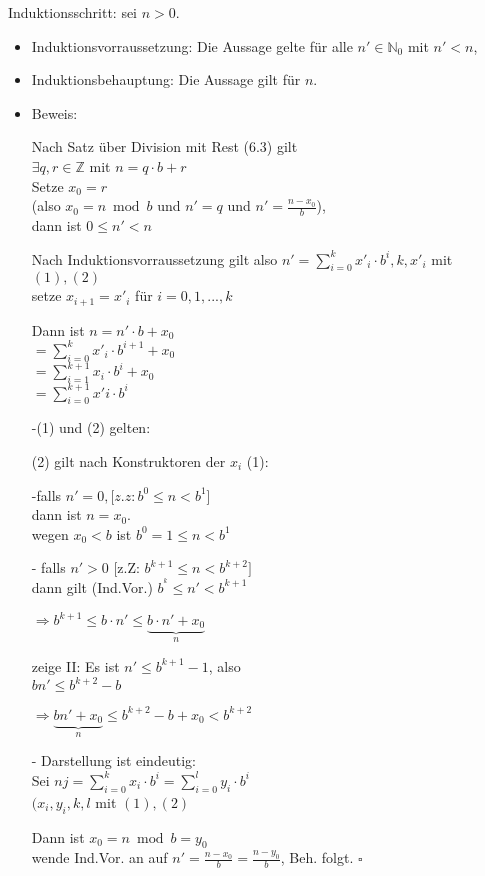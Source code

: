 \documentclass[a4paper, 12pt, twoside] {article}
\begin{document}
Induktionsschritt: sei $n > 0$.
\begin{itemize}

\item Induktionsvorraussetzung: Die Aussage gelte für alle $n' \in \mathbb{N}_0$ mit $n' < n$,

\item Induktionsbehauptung: Die Aussage gilt für $n$.


\item Beweis:

Nach Satz über Division mit Rest (6.3) gilt \\
$\exists q, r \in \mathbb{Z}$ mit $n = q \cdot b + r$ \\
Setze $x_0 = r$ \\
(also $x_0 = n \bmod b$ und $n' = q$ und $n' = \frac{n-x_0}{b}$), \\
dann ist $0 \leq n' < n$

Nach Induktionsvorraussetzung gilt also $n' = \displaystyle\sum_{i=0}^k x'_i  \cdot  b^i, k, x'_i$ mit $(1), (2)$ \\
setze $x_{i+1} = x'_i$ für $i = 0, 1, ..., k$

Dann ist $n = n' \cdot b + x_0$ \\
$=\displaystyle\sum_{i=0}^{k} x'_i \cdot b^{i+1} + x_0$ \\
$=\displaystyle\sum_{i=1}^{k+1} x_i  \cdot  b^i + x_0$ \\
$=\displaystyle\sum_{i=0}^{k+1} x'i  \cdot  b^i$

-(1) und (2) gelten:

(2) gilt nach Konstruktoren der $x_i$ \/
(1):

-falls $n' = 0, [z.z: b^0 \leq n < b^1$] \\
dann ist $n = x_0$. \\
wegen $x_0 < b$ ist $b^0 = 1 \leq n < b^1$

- falls $n'>0$ [z.Z: $b^{k+1} \leq n < b^{k+2}]$ \\
dann gilt (Ind.Vor.) $b^^k \leq n' < b^{k+1}$

$\Rightarrow b^{k+1} \leq b \cdot n' \leq \underbrace{b \cdot n' + x_0}_{n}$

zeige II: Es ist $n' \leq b^{k+1} - 1$, also \\
$b n' \leq b^{k+2} - b$

$\Rightarrow \underbrace{b n' + x_0}_{n} \leq b^{k+2} - b + x_0 < b^{k+2}$

- Darstellung ist eindeutig: \\
Sei $nj = \displaystyle\sum_{i=0}^{k} x_i \cdot  b^i = \displaystyle\sum_{i=0}^{l} y_i  \cdot  b^i$ \\
$(x_i, y_i, k, l$ mit $(1), (2)$

Dann ist $x_0 = n \bmod b = y_0$ \\
wende Ind.Vor. an auf $n' = \frac{n-x_0}{b} = \frac{n-y_0}{b}$, Beh. folgt. \hfill $\square$

\end{itemize}
\end{document}
